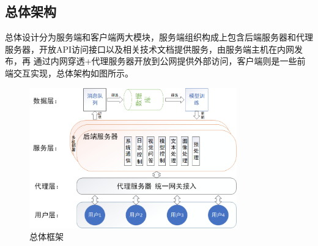 \subsection{总体架构}
总体设计分为服务端和客户端两大模块，服务端组织构成上包含后端服务器和代理服务器，开放API访问接口以及相关技术文档提供服务，由服务端主机在内网发布，再
通过内网穿透+代理服务器开放到公网提供外部访问，客户端则是一些前端交互实现，总体架构如图所示。
\begin{figure}[htbp]
	\centering	
	\includegraphics[width=0.8\textwidth]{Fig/myfig/chapter5/sys_framwork.png}  %
	\caption{\label{sys_framwork}总体框架} 
\end{figure}

